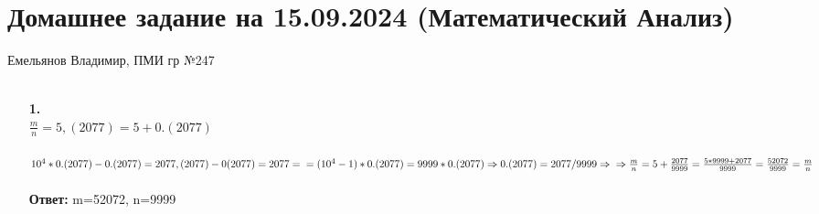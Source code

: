 \documentclass[a4paper]{article}
\renewcommand{\f}[2]{\frac{#1}{#2}}
\begin{document}
\section*{Домашнее задание на 15.09.2024 (Математический Анализ)}
{\large Емельянов Владимир, ПМИ гр №247}\\\\
\begin{enumerate}
    \item[\textbf{1.}] \indent\\
    $\f{m}{n}=5,(2077) = 5+0.(2077)$\\\\
    $10^4*0.(2077)-0.(2077) = 2077,(2077)-0(2077)=2077=\\
    =(10^4-1)*0.(2077)=9999*0.(2077)\Rightarrow 0.(2077)=2077/9999 \Rightarrow\\
    \Rightarrow \f{m}{n}=5+\f{2077}{9999} = \f{5*9999+2077}{9999} = \f{52072}{9999}=\f{m}{n}$\\
    \\\textbf{Ответ:} m=52072, n=9999


\end{enumerate}
\end{document}
